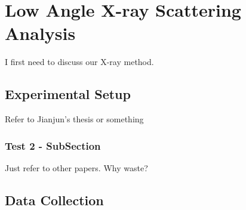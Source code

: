\chapter{Low Angle X-ray Scattering Analysis}
I first need to discuss our X-ray method.

\section{Experimental Setup}
Refer to Jianjun's thesis or something

\subsection{Test 2 - SubSection}
Just refer to other papers. Why waste?

\section{Data Collection}


